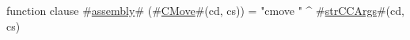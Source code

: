 function clause #\hyperref[sailMIPSzassembly]{assembly}# (#\hyperref[sailMIPSzCMove]{CMove}#(cd, cs)) = "cmove " ^ #\hyperref[sailMIPSzstrCCArgs]{strCCArgs}#(cd, cs)
